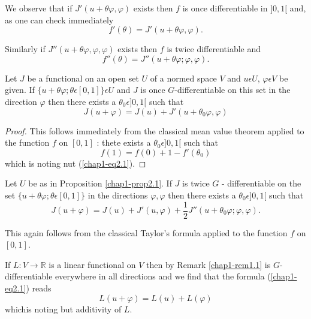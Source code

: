 We observe that if $J'(u + \theta \varphi, \varphi)$ exists then $f$ is once differentiable in $]0, 1[$ and, as one can check immediately
$$
f'(\theta) = J'(u + \theta \varphi, \varphi).
$$\pageoriginale

Similarly if $J''(u + \theta \varphi, \varphi, \varphi)$ exists then $f$ is twice differentiable and 
$$
f''(\theta) = J''(u + \theta \varphi ; \varphi, \varphi).
$$

\begin{proposition}\label{chap1-prop2.1}
Let $J$ be a functional on an open set $U$ of a normed space $V$ and $u \epsilon U$, $\varphi \epsilon V$ be given. If $\{u + \theta \varphi ; \theta \epsilon [0, 1]\} \epsilon U$ and $J$ is once $G$-differentiable on this set in the direction $\varphi$ then there exists a $\theta_{0} \epsilon ]0, 1[$ such that
\begin{equation*}
 J(u + \varphi) = J(u) + J'(u + \theta_{0} \varphi, \varphi)\tag{2.1}\label{chap1-eq2.1}
\end{equation*}
\end{proposition}

\begin{proof}
This follows immediately from the classical mean value theorem applied to the function $f$ on $[0, 1]$ : thete exists a $\theta_{0} \epsilon ]0, 1[$ such that
$$
f(1) = f(0) + 1-f'(\theta_{0})
$$
which is noting nut (\ref{chap1-eq2.1}).
\end{proof}

\begin{proposition}\label{chap1-prop2.2}
Let $U$ be as in Proposition \ref{chap1-prop2.1}. If $J$ is twice
$G$ - differentiable on the set $\{u + \theta \varphi ; \theta \epsilon
[0, 1]\}$ in the directions $\varphi, \varphi$ then there exists a
$\theta_{0} \epsilon ]0, 1[$ such that 
\begin{equation*}
 J(u + \varphi) = J(u) + J'(u, \varphi) + \frac{1}{2} J''(u + \theta_{0} \varphi ; \varphi ,  \varphi).\tag{2.2}\label{chap1-eq2.2}
\end{equation*}
\end{proposition}

This again follows from the classical Taylor's formula applied to the function $f$ on $[0, 1]$.

\begin{remark}\label{chap1-rem2.1}
If $L : V \to \mathbb{R}$ is a linear functional on $V$ then by Remark \ref{chap1-rem1.1} is $G$-differentiable everywhere in all directions and we find that the formula (\ref{chap1-eq2.1}) reads
$$
L(u + \varphi) = L(u) + L(\varphi)
$$
which\pageoriginale is noting but additivity of $L$.
\end{remark}

